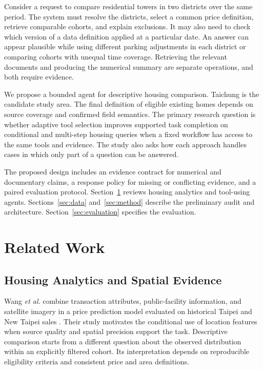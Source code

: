 \documentclass[conference]{IEEEtran}
\begin{document}
Consider a request to compare residential towers in two districts over the same period. The system must resolve the districts, select a common price definition, retrieve comparable cohorts, and explain exclusions. It may also need to check which version of a data definition applied at a particular date. An answer can appear plausible while using different parking adjustments in each district or comparing cohorts with unequal time coverage. Retrieving the relevant documents and producing the numerical summary are separate operations, and both require evidence.

We propose a bounded agent for descriptive housing comparison. Taichung is the candidate study area. The final definition of eligible existing homes depends on source coverage and confirmed field semantics. The primary research question is whether adaptive tool selection improves supported task completion on conditional and multi-step housing queries when a fixed workflow has access to the same tools and evidence. The study also asks how each approach handles cases in which only part of a question can be answered.

The proposed design includes an evidence contract for numerical and documentary claims, a response policy for missing or conflicting evidence, and a paired evaluation protocol. Section~\ref{sec:related} reviews housing analytics and tool-using agents. Sections~\ref{sec:data} and~\ref{sec:method} describe the preliminary audit and architecture. Section~\ref{sec:evaluation} specifies the evaluation.

\section{Related Work}
\label{sec:related}
\subsection{Housing Analytics and Spatial Evidence}
Wang \emph{et al.} combine transaction attributes, public-facility information, and satellite imagery in a price prediction model evaluated on historical Taipei and New Taipei sales \cite{wang}. Their study motivates the conditional use of location features when source quality and spatial precision support the task. Descriptive comparison starts from a different question about the observed distribution within an explicitly filtered cohort. Its interpretation depends on reproducible eligibility criteria and consistent price and area definitions.
\end{document}
